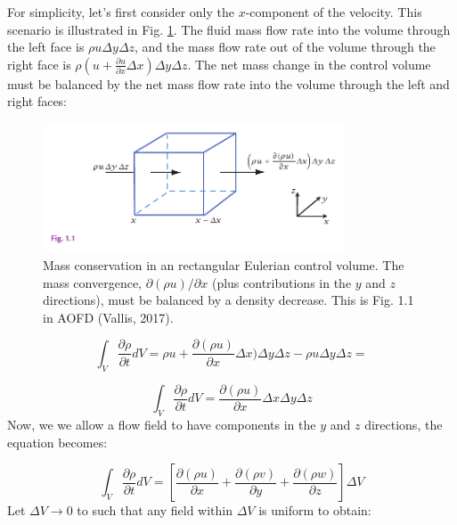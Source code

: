 \documentclass[12pt]{article}
\numberwithin{equation}{section}
\numberwithin{figure}{section}
\numberwithin{table}{section}
\begin{document}
For simplicity, let's first consider only the $x$-component of the velocity.
This scenario is illustrated in Fig. \ref{fig:continuity1}.
The fluid mass flow rate into the volume through the left face is $\rho u \Delta y \Delta z$,
and the mass flow rate out of the volume through the right face is
$\rho (u + \frac{\partial u}{\partial x} \Delta x) \Delta y \Delta z$.
The net mass change in the control volume must be balanced by the net mass flow
rate into the volume through the left and right faces:

\begin{figure}[h]
  \centering
  \includegraphics[width=0.8\textwidth]{assets/fig_continuity1.pdf}
  \caption{
    Mass conservation in an rectangular Eulerian control volume.
    The mass convergence, $\partial(\rho u)/\partial x$
    (plus contributions in the $y$ and $z$ directions),
    must be balanced by a density decrease.
    This is Fig. 1.1 in AOFD (Vallis, 2017).
  }
  \label{fig:continuity1}
\end{figure}

\begin{equation}
  \int_V \frac{\partial \rho}{\partial t} dV =
  \rho u + \frac{\partial (\rho u)}{\partial x} \Delta x) \Delta y \Delta z - \rho u \Delta y \Delta z =
\end{equation}

\begin{equation}
  \int_V \frac{\partial \rho}{\partial t} dV =
  \frac{\partial (\rho u)}{\partial x} \Delta x \Delta y \Delta z
\end{equation}
Now, we we allow a flow field to have components in the $y$ and $z$ directions,
the equation becomes:

\begin{equation}
  \int_V \frac{\partial \rho}{\partial t} dV =
  \left[\frac{\partial (\rho u)}{\partial x} + \frac{\partial (\rho v)}{\partial y} + \frac{\partial (\rho w)}{\partial z} \right] \Delta V
\end{equation}
Let $\Delta V \to 0$ to such that any field within $\Delta V$ is uniform to obtain:
\end{document}
